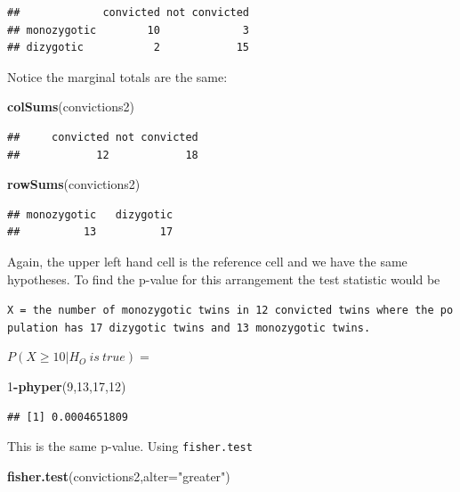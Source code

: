 \documentclass[]{book}
\newenvironment{Shaded}{\begin{snugshade}}{\end{snugshade}}
\newcommand{\KeywordTok}[1]{\textcolor[rgb]{0.13,0.29,0.53}{\textbf{#1}}}
\newcommand{\DataTypeTok}[1]{\textcolor[rgb]{0.13,0.29,0.53}{#1}}
\newcommand{\DecValTok}[1]{\textcolor[rgb]{0.00,0.00,0.81}{#1}}
\newcommand{\StringTok}[1]{\textcolor[rgb]{0.31,0.60,0.02}{#1}}
\newcommand{\OperatorTok}[1]{\textcolor[rgb]{0.81,0.36,0.00}{\textbf{#1}}}
\newcommand{\NormalTok}[1]{#1}
\theoremstyle{definition}
\theoremstyle{definition}
\theoremstyle{definition}
\theoremstyle{remark}
\begin{document}
\begin{verbatim}
##             convicted not convicted
## monozygotic        10             3
## dizygotic           2            15
\end{verbatim}

Notice the marginal totals are the same:

\begin{Shaded}
\begin{Highlighting}[]
\KeywordTok{colSums}\NormalTok{(convictions2)}
\end{Highlighting}
\end{Shaded}

\begin{verbatim}
##     convicted not convicted 
##            12            18
\end{verbatim}

\begin{Shaded}
\begin{Highlighting}[]
\KeywordTok{rowSums}\NormalTok{(convictions2)}
\end{Highlighting}
\end{Shaded}

\begin{verbatim}
## monozygotic   dizygotic 
##          13          17
\end{verbatim}

Again, the upper left hand cell is the reference cell and we have the
same hypotheses. To find the p-value for this arrangement the test
statistic would be

\texttt{X\ =\ the\ number\ of\ monozygotic\ twins\ in\ 12\ convicted\ twins\ where\ the\ population\ has\ 17\ dizygotic\ twins\ and\ 13\ monozygotic\ twins.}

\(P(X \geq 10|H_{O} \: is \: true) =\)

\begin{Shaded}
\begin{Highlighting}[]
\DecValTok{1}\OperatorTok{-}\KeywordTok{phyper}\NormalTok{(}\DecValTok{9}\NormalTok{,}\DecValTok{13}\NormalTok{,}\DecValTok{17}\NormalTok{,}\DecValTok{12}\NormalTok{)}
\end{Highlighting}
\end{Shaded}

\begin{verbatim}
## [1] 0.0004651809
\end{verbatim}

This is the same p-value. Using \texttt{fisher.test}

\begin{Shaded}
\begin{Highlighting}[]
\KeywordTok{fisher.test}\NormalTok{(convictions2,}\DataTypeTok{alter=}\StringTok{"greater"}\NormalTok{)}
\end{Highlighting}
\end{Shaded}
\end{document}

